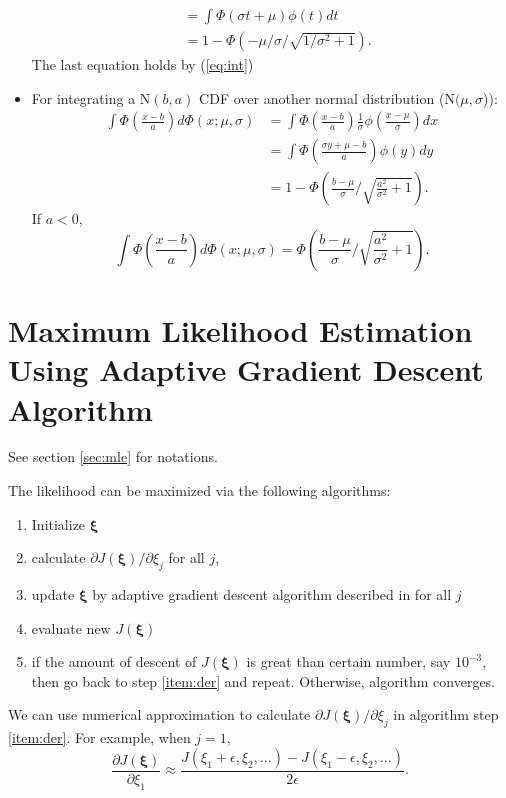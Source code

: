 \documentclass[12pt]{article}
\begin{document}
\begin{itemize}
\begin{align*}
    & = \int \Phi(\sigma t + \mu)\phi(t) dt \\
    & = 1 - \Phi(-\mu/\sigma/\sqrt{1/\sigma^2+1}).
  \end{align*}
  The last equation holds by (\ref{eq:int})
\item For integrating a $\textrm{N}(b, a)$ CDF over another normal
  distribution ($\textrm{N}(\mu, \sigma$)):
  \begin{align}
    \int \Phi \left( \frac{x-b}{a} \right) d\Phi(x; \mu, \sigma) & = \int \Phi \left( \frac{x-b}{a} \right) \frac{1}{\sigma} \phi \left( \frac{x-\mu}{\sigma} \right) dx \nonumber\\
    &= \int \Phi \left( \frac{\sigma y + \mu - b}{a}  \right) \phi(y) dy \nonumber \\
    \label{eq:intg1}
    & = 1- \Phi \left( \frac{b-\mu}{\sigma} /
      \sqrt{\frac{a^2}{\sigma^2}+1} \right).
  \end{align}
  If $a < 0$,
  \begin{equation}
    \label{eq:intg2}
    \int \Phi \left( \frac{x-b}{a} \right) d\Phi(x; \mu, \sigma) = \Phi \left( \frac{b-\mu}{\sigma} / \sqrt{\frac{a^2}{\sigma^2}+1} \right).
  \end{equation}

\end{itemize}

\section{Maximum Likelihood Estimation Using Adaptive Gradient Descent
  Algorithm}
\label{sec:agda}

See section \ref{sec:mle} for notations.

The likelihood can be maximized via the following algorithms:
\begin{enumerate}
\item Initialize $\bm \xi$
\item \label{item:der} calculate $\partial J(\bm \xi) / \partial
  \xi_j$ for all $j$,
\item update $\bm \xi$ by adaptive gradient descent algorithm
  described in \citep{ried1993} for all $j$
\item evaluate new $J(\bm \xi)$
\item if the amount of descent of $J ( \bm \xi)$ is great than certain
  number, say $10^{-3}$, then go back to step \ref{item:der} and
  repeat. Otherwise, algorithm converges.
\end{enumerate}

We can use numerical approximation to calculate $\partial J(\bm
\xi)/\partial \xi_j$ in algorithm step \ref{item:der}. For example,
when $j = 1$,
\begin{displaymath}
  \frac{\partial J(\bm \xi)}{\partial \xi_1} \approx \frac{J(\xi_1 + \epsilon, \xi_2, \ldots) - J(\xi_1 - \epsilon, \xi_2 , \ldots)}{2\epsilon}.
\end{displaymath}
\end{document}
